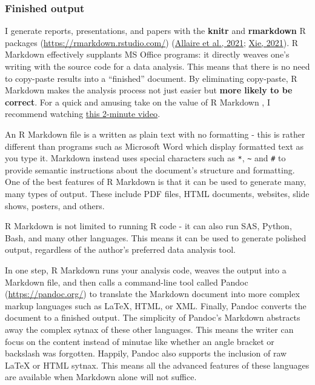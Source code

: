 \documentclass[
  letterpaper,
  openany]{book}
\begin{document}
\hypertarget{r-markdown-finished-output}{%
\subsubsection{Finished output}\label{r-markdown-finished-output}}

I generate reports, presentations, and papers with the \textbf{knitr} and \textbf{rmarkdown} R packages (\url{https://rmarkdown.rstudio.com/}) (\protect\hyperlink{ref-R-rmarkdown}{Allaire et al., 2021}; \protect\hyperlink{ref-R-knitr}{Xie, 2021}).
R Markdown effectively supplants MS Office programs: it directly weaves one's writing with the source code for a data analysis.
This means that there is no need to copy-paste results into a ``finished'' document.
By eliminating copy-paste, R Markdown makes the analysis process not just easier but \textbf{more likely to be correct}.
For a quick and amusing take on the value of R Markdown , I recommend watching \href{https://www.youtube.com/watch?v=s3JldKoA0zw}{this 2-minute video}.

An R Markdown file is a written as plain text with no formatting - this is rather different than programs such as Microsoft Word which display formatted text as you type it.
Markdown instead uses special characters such as \texttt{*}, \texttt{\textasciitilde{}} and \texttt{\#} to provide semantic instructions about the document's structure and formatting.
One of the best features of R Markdown is that it can be used to generate many, many types of output.
These include PDF files, HTML documents, websites, slide shows, posters, and others.

R Markdown is not limited to running R code - it can also run SAS, Python, Bash, and many other languages.
This means it can be used to generate polished output, regardless of the author's preferred data analysis tool.

In one step, R Markdown runs your analysis code, weaves the output into a Markdown file, and then calls a command-line tool called Pandoc (\url{https://pandoc.org/}) to translate the Markdown document into more complex markup languages such as \LaTeX, HTML, or XML. Finally, Pandoc converts the document to a finished output.
The simplicity of Pandoc's Markdown abstracts away the complex sytnax of these other languages. This means the writer can focus on the content instead of minutae like whether an angle bracket or backslash was forgotten.
Happily, Pandoc also supports the inclusion of raw \LaTeX{} or HTML sytnax.
This means all the advanced features of these languages are available when Markdown alone will not suffice.
\end{document}
